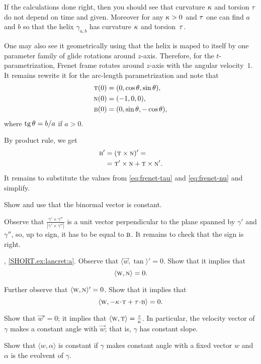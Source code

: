 If the calculations done right, then you should see that curvature $\kappa$ and torsion $\tau$ do not depend on time and given.
Moreover for any $\kappa>0$ and $\tau$ one can find $a$ and $b$ so that the helix $\gamma_{a,b}$ has curvature $\kappa$ and torsion~$\tau$.

One may also see it geometrically using that the helix is maped to itself by one parameter family of glide rotations around $z$-axis.
Therefore, for the $t$-parametrization, Frenet frame rotates around $z$-axis with the angular velocity~$1$.
It remains rewrite it for the arc-length parametrization and note that 
\begin{align*}
\textsc{t}(0)&=(0,\cos\theta, \sin\theta),
\\
\textsc{n}(0)&=(-1,0,0),
\\
\textsc{b}(0)&=(0,\sin\theta, -\cos\theta),
\end{align*}
where $\tg\theta\z=b/a$ if $a>0$. 

 By product rule, we get
\begin{align*}
\textsc{b}'&=(\textsc{t}\times \textsc{n})'=
\\
&=\textsc{t}'\times \textsc{n}+\textsc{t}\times\textsc{n}'.
\end{align*}
It remains to substitute the values from \ref{eq:frenet-tau} and \ref{eq:frenet-nu} and simplify.


Show and use that the binormal vector is constant.

 Observe that $\tfrac{\gamma'\times\gamma''}{|\gamma'\times\gamma''|}$ is a unit vector perpendicular to the plane spanned by $\gamma'$ and $\gamma''$, so, up to sign, it has to be equal to $\textsc{b}$. It remains to check that the sign is right.


\parbf{\ref{ex:lancret}}, \ref{SHORT.ex:lancret:a}.
Observe that 
$\langle \vec w,\tan\rangle'=0$.
Show that it implies that
\[\langle \textsc w, \textsc{n}\rangle =0.\]

Further observe that 
$\langle \textsc w,\textsc{n}\rangle'=0$.
Show that it implies that 
\[\langle \vec w, -\kur\cdot\tan+\tor\cdot \bi\rangle =0.\]

Show that $\vec w'=0$;
it implies that $\langle \textsc w,\textsc{t}\rangle=\tfrac{\tau}{\kappa}$.
In particular, the velocity vector of $\gamma$ makes a constant angle with $\vec w$; that is, $\gamma$ has constant slope.

Show that $\langle w,\alpha\rangle$ is constant if $\gamma$ makes constant angle with a fixed vector $w$ and $\alpha$ is the evolvent of $\gamma$.

